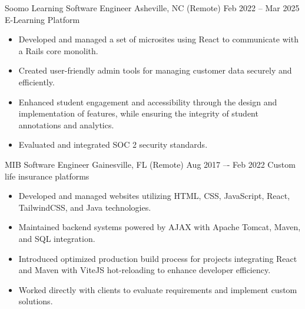 \documentclass[10pt, a4paper]{cvhari}
\begin{document}
\makecvheader
\medskip

    \company
        {Soomo Learning}
        {Software Engineer}
        {Asheville, NC (Remote)}
        {Feb 2022 -- Mar 2025}
        {E-Learning Platform}
    \begin{itemize}
        \item Developed and managed a set of microsites using React to communicate with a Rails core monolith. \smallskip
        \item Created user-friendly admin tools for managing customer data securely and efficiently.\smallskip
        \item Enhanced student engagement and accessibility through the design and implementation of features, while ensuring the integrity of student annotations and analytics.\smallskip
        \item Evaluated and integrated SOC 2 security standards. \medskip
    \end{itemize}
    
    \smallskip
    \divider
    \smallskip

    \company
        {MIB}
        {Software Engineer}
        {Gainesville, FL (Remote)}
        {Aug 2017 –- Feb 2022}
        {Custom life insurance platforms}
        
        \begin{itemize}
            \item Developed and managed websites utilizing HTML, CSS, JavaScript, React, TailwindCSS, and Java technologies.\smallskip
            \item Maintained backend systems powered by AJAX with Apache Tomcat, Maven, and SQL integration.\smallskip
            \item Introduced optimized production build process for projects integrating React and Maven with ViteJS hot-reloading to enhance developer efficiency.\smallskip
            \item Worked directly with clients to evaluate requirements and implement custom solutions.\medskip
        \end{itemize}
\end{document}
